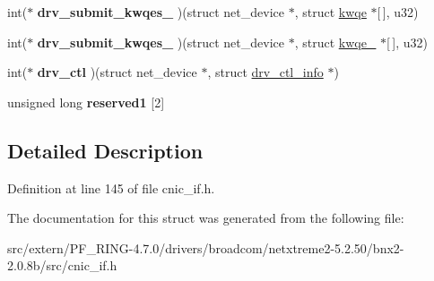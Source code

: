 \begin{DoxyCompactItemize}
\item 
\hypertarget{structcnic__eth__dev_a4e47749dc2c3b30bfaef48c91a00bd60}{
int($\ast$ {\bfseries drv\_\-submit\_\-kwqes\_} )(struct net\_\-device $\ast$, struct \hyperlink{structkwqe}{kwqe} $\ast$\mbox{[}$\,$\mbox{]}, u32)}
\label{structcnic__eth__dev_a4e47749dc2c3b30bfaef48c91a00bd60}

\item 
\hypertarget{structcnic__eth__dev_a7e65a2aeb2dd6bebacd8190c55b5e6dc}{
int($\ast$ {\bfseries drv\_\-submit\_\-kwqes\_} )(struct net\_\-device $\ast$, struct \hyperlink{structkwqe__16}{kwqe\_} $\ast$\mbox{[}$\,$\mbox{]}, u32)}
\label{structcnic__eth__dev_a7e65a2aeb2dd6bebacd8190c55b5e6dc}

\item 
\hypertarget{structcnic__eth__dev_a7799957d154b18b99bf5c30bf5e20fb5}{
int($\ast$ {\bfseries drv\_\-ctl} )(struct net\_\-device $\ast$, struct \hyperlink{structdrv__ctl__info}{drv\_\-ctl\_\-info} $\ast$)}
\label{structcnic__eth__dev_a7799957d154b18b99bf5c30bf5e20fb5}

\item 
\hypertarget{structcnic__eth__dev_a0f964e6a71cc7dbc80aac01dc4a79e45}{
unsigned long {\bfseries reserved1} \mbox{[}2\mbox{]}}
\label{structcnic__eth__dev_a0f964e6a71cc7dbc80aac01dc4a79e45}

\end{DoxyCompactItemize}


\subsection{Detailed Description}


Definition at line 145 of file cnic\_\-if.h.



The documentation for this struct was generated from the following file:\begin{DoxyCompactItemize}
\item 
src/extern/PF\_\-RING-\/4.7.0/drivers/broadcom/netxtreme2-\/5.2.50/bnx2-\/2.0.8b/src/cnic\_\-if.h\end{DoxyCompactItemize}
